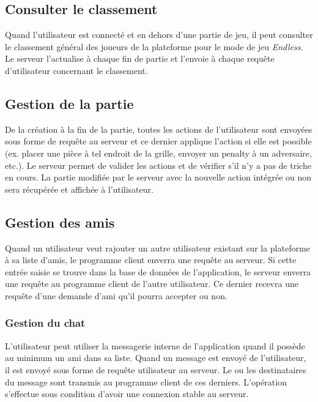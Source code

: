 \documentclass{article}
\begin{document}
\subsection{Consulter le classement}

Quand l'utilisateur est connecté et en dehors d'une partie de jeu, il peut consulter le classement général des joueurs de la plateforme pour le mode de jeu \textit{Endless}. Le serveur l'actualise à chaque fin de partie et l'envoie à chaque requête d'utilisateur concernant le classement.

\subsection{Gestion de la partie}

De la création à la fin de la partie, toutes les actions de l'utilisateur sont envoyées sous forme de requête au serveur et ce dernier applique l'action si elle est possible (ex. placer une pièce à tel endroit de la grille, envoyer un penalty à un adversaire, etc.). Le serveur permet de valider les actions et de vérifier s'il n'y a pas de triche en cours. La partie modifiée par le serveur avec la nouvelle action intégrée ou non sera récupérée et affichée à l'utilisateur.

\subsection{Gestion des amis}

Quand un utilisateur veut rajouter un autre utilisateur existant sur la plateforme à sa liste d'amis, le programme client enverra une requête au serveur. Si cette entrée saisie se trouve dans la base de données de l'application, le serveur enverra une requête au programme client de l'autre utilisateur. Ce dernier recevra une requête d'une demande d'ami qu'il pourra accepter ou non.

\subsubsection{Gestion du chat}

L'utilisateur peut utiliser la messagerie interne de l'application quand il possède au minimum un ami dans sa liste. Quand un message est envoyé de l'utilisateur, il est envoyé sous forme de requête utilisateur au serveur. Le ou les destinataires du message sont transmis au programme client de ces derniers. L'opération s'effectue sous condition d'avoir une connexion stable au serveur.
\end{document}
